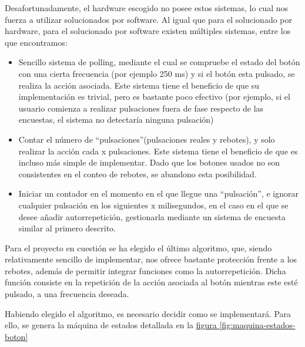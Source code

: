 \documentclass[12pt,letterpaper]{article}
\newcommand*{\iref}[2]{
  \hyperref[#1]{#2
  \ref*{#1}}
  }
\begin{document}
Desafortunadamente, el hardware escogido no posee estos sistemas, lo
cual nos fuerza a utilizar solucionados por software. Al igual que
para el solucionado por hardware, para el solucionado por software
existen múltiples sistemas, entre los que encontramos:
\begin{itemize}
  \item Sencillo sistema de polling, mediante el cual se compruebe el
    estado del botón con una cierta frecuencia (por ejemplo 250 ms) y
    si el botón esta pulsado, se realiza la acción asociada. Este
    sistema tiene el beneficio de que su implementación es trivial,
    pero es bastante poco efectivo (por ejemplo, si el usuario
    comienza a realizar pulsaciones fuera de fase respecto de las
    encuestas, el sistema no detectaría ninguna pulsación)
  \item Contar el número de ``pulsaciones''(pulsaciones reales y
    rebotes), y solo realizar la acción cada x pulsaciones. Este
    sistema tiene el beneficio de que es incluso más simple de
    implementar. Dado que los botones usados no son consistentes
    en el conteo de rebotes, se abandono esta posibilidad.
  \item Iniciar un contador en el momento en el que llegue una
    ``pulsación'', e ignorar cualquier pulsación en los siguientes x
    milisegundos, en el caso en el que se desee añadir autorrepetición,
    gestionarla mediante un sistema de encuesta similar al primero
    descrito.
\end{itemize}

Para el proyecto en cuestión se ha elegido el último algoritmo, que,
siendo relativamente sencillo de implementar, nos ofrece bastante
protección frente a los rebotes, además de permitir integrar funciones
como la autorrepetición. Dicha función consiste en la repetición de la
acción asociada al botón mientras este esté pulsado, a una frecuencia
deseada.

Habiendo elegido el algoritmo, es necesario decidir como se
implementará. Para ello, se genera la máquina de estados detallada en
la \iref{fig:maquina-estados-boton}{figura}
\end{document}
